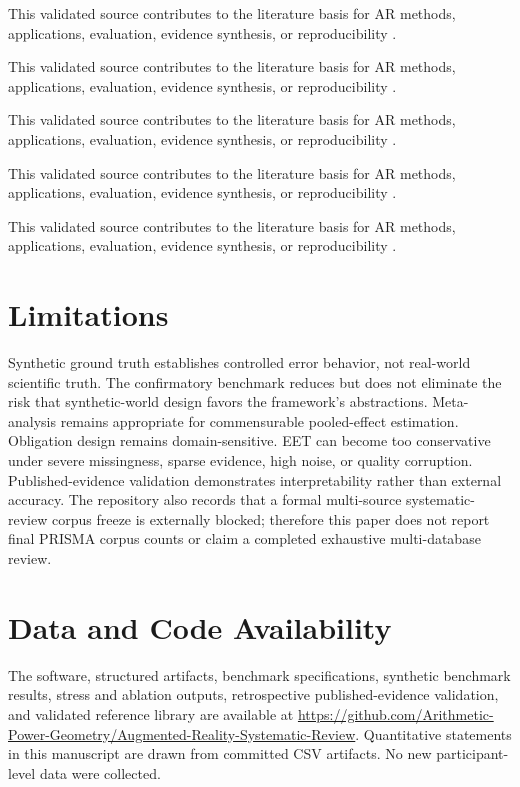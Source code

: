 \documentclass[journal]{IEEEtran}
\begin{document}
This validated source contributes to the literature basis for AR methods, applications, evaluation, evidence synthesis, or reproducibility \cite{Runji2023MaintenanceOperatorNeeds,Ramtohul2024CulturalHeritage,Chen2022ARRetail,Liang2021ARTourism,Senyer2025CulturalHeritageMobile}.

This validated source contributes to the literature basis for AR methods, applications, evaluation, evidence synthesis, or reproducibility \cite{Balalle2025HigherEducationXR,Kazlaris2025CollaborativeLearning,Salman2025SmartFacilities,PerezPachon2020ImageOverlaySurgery,Kumar2022OnlineRetailAR}.

This validated source contributes to the literature basis for AR methods, applications, evaluation, evidence synthesis, or reproducibility \cite{Wang2021MultimodalInteraction,Knoben2026AccessibleWorkshops,Szentirmai2024UniversallyDesignedAR,VidalBalea2020CollaborativeIndustry,Perno2025DigitalTwinsAR}.

This validated source contributes to the literature basis for AR methods, applications, evaluation, evidence synthesis, or reproducibility \cite{Begout2022ARAuthoringDT,Fan2021ARAssetTracking,Guedes2023IsThisReal,Lin2016AREducationDisabilities,Alfakhori2026SituatedUrbanAR}.

This validated source contributes to the literature basis for AR methods, applications, evaluation, evidence synthesis, or reproducibility \cite{VanDenBergh2025DigitalTwinOperators,Mohanty2025PupilDilationAR}.


\section{Limitations}
Synthetic ground truth establishes controlled error behavior, not real-world scientific truth. The confirmatory benchmark reduces but does not eliminate the risk that synthetic-world design favors the framework's abstractions. Meta-analysis remains appropriate for commensurable pooled-effect estimation. Obligation design remains domain-sensitive. EET can become too conservative under severe missingness, sparse evidence, high noise, or quality corruption. Published-evidence validation demonstrates interpretability rather than external accuracy. The repository also records that a formal multi-source systematic-review corpus freeze is externally blocked; therefore this paper does not report final PRISMA corpus counts or claim a completed exhaustive multi-database review.

\section{Data and Code Availability}
The software, structured artifacts, benchmark specifications, synthetic benchmark results, stress and ablation outputs, retrospective published-evidence validation, and validated reference library are available at \url{https://github.com/Arithmetic-Power-Geometry/Augmented-Reality-Systematic-Review}. Quantitative statements in this manuscript are drawn from committed CSV artifacts. No new participant-level data were collected.
\end{document}
